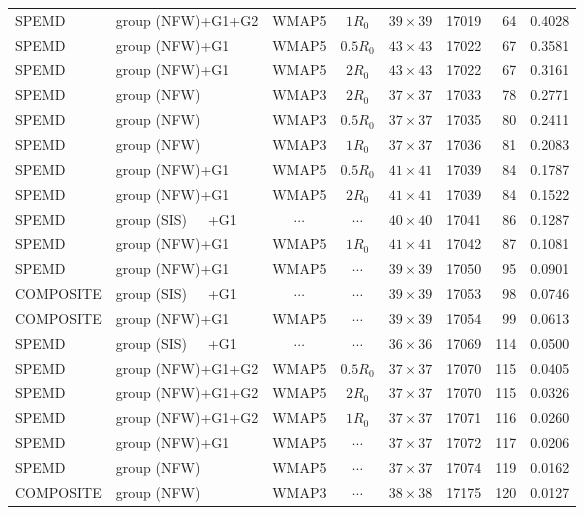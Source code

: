 \documentclass[useAMS,usenatbib]{mnras}
\def\nomicro{$\cdots$}
\def\nodata{$\cdots$}
\begin{document}
\begin{table}
\begin{tabular}{llccccrr}
        SPEMD     & group (NFW)+G1+G2 &WMAP5 & $1R_{0}$   &$39\times39$ & 17019 & 64 & 0.4028\\
        SPEMD     & group (NFW)+G1    &WMAP5 & $0.5R_{0}$ &$43\times43$ & 17022 & 67 & 0.3581\\
        SPEMD     & group (NFW)+G1    &WMAP5 & $2R_{0}$   &$43\times43$ & 17022 & 67 & 0.3161\\
        SPEMD     & group (NFW)       &WMAP3 & $2R_{0}$   &$37\times37$ & 17033 & 78 & 0.2771\\
        SPEMD     & group (NFW)       &WMAP3 & $0.5R_{0}$ &$37\times37$ & 17035 & 80 & 0.2411\\
        SPEMD     & group (NFW)       &WMAP3 & $1R_{0}$   &$37\times37$ & 17036 & 81 & 0.2083\\
        SPEMD     & group (NFW)+G1    &WMAP5 & $0.5R_{0}$ &$41\times41$ & 17039 & 84 & 0.1787\\
        SPEMD     & group (NFW)+G1    &WMAP5 & $2R_{0}$   &$41\times41$ & 17039 & 84 & 0.1522\\
        SPEMD     & group (SIS)~~~+G1 &\nodata& \nomicro   &$40\times40$ & 17041 & 86 & 0.1287\\
        SPEMD     & group (NFW)+G1    &WMAP5 & $1R_{0}$   &$41\times41$ & 17042 & 87 & 0.1081\\
        SPEMD     & group (NFW)+G1    &WMAP5 & \nomicro   &$39\times39$ & 17050 & 95 & 0.0901\\
        COMPOSITE & group (SIS)~~~+G1 &\nodata &\nomicro  &$39\times39$ & 17053 & 98 & 0.0746\\
        COMPOSITE & group (NFW)+G1    &WMAP5 & \nomicro  &$39\times39$ & 17054 & 99 & 0.0613\\
        SPEMD     & group (SIS)~~~+G1 &\nodata& \nomicro  &$36\times36$ & 17069 & 114 & 0.0500\\
        SPEMD     & group (NFW)+G1+G2 &WMAP5 & $0.5R_{0}$&$37\times37$ & 17070 & 115 & 0.0405\\
        SPEMD     & group (NFW)+G1+G2 &WMAP5 & $2R_{0}$  &$37\times37$ & 17070 & 115 & 0.0326\\
        SPEMD     & group (NFW)+G1+G2 &WMAP5 & $1R_{0}$  &$37\times37$ & 17071 & 116 & 0.0260\\
        SPEMD     & group (NFW)+G1    &WMAP5 & \nomicro  &$37\times37$ & 17072 & 117 & 0.0206\\
        SPEMD     & group (NFW)       &WMAP5 & \nomicro  &$37\times37$ & 17074 & 119 & 0.0162\\
        COMPOSITE & group (NFW)       &WMAP3 & \nomicro&$38\times38$ & 17175 & 120 & 0.0127\\

\end{tabular}
\end{table}
\end{document}

